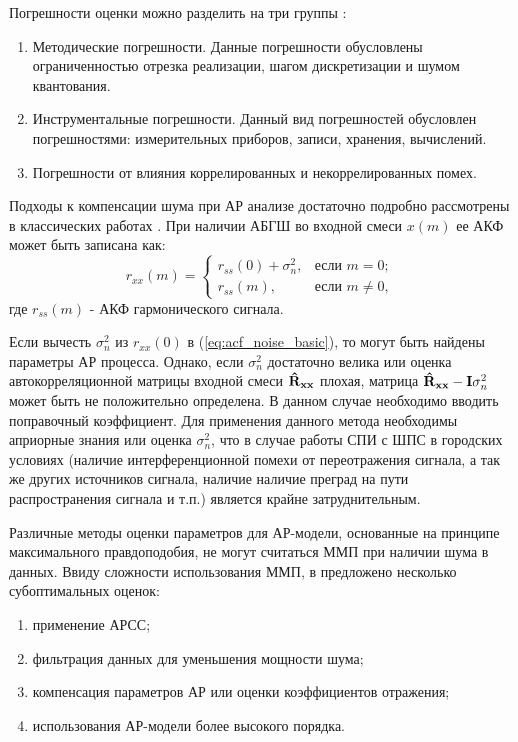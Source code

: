Погрешности оценки можно разделить на три группы \cite{bolshakov-book}:
\begin{enumerate}
	\item Методические погрешности. Данные погрешности обусловлены ограниченностью отрезка реализации, шагом дискретизации и шумом квантования.
	\item Инструментальные погрешности. Данный вид погрешностей обусловлен погрешностями: измерительных приборов, записи, хранения, вычислений.
	\item Погрешности от влияния коррелированных и некоррелированных помех.
\end{enumerate}

Подходы к компенсации шума при АР анализе достаточно подробно рассмотрены в классических работах \cite{kay_ar_book, kay_noise_compensation}.
При наличии АБГШ во входной смеси ${x(m)}$ ее АКФ может быть записана как:
\begin{equation}
	\label{eq:acf_noise_basic}
	r_{xx}(m) =	\begin{cases}
				r_{ss}(0) + \sigma_n^2, & \mbox{если } m=0; \\
				r_{ss}(m), & \mbox{если } m \ne 0,
			\end{cases}
\end{equation}
где ${r_{ss}(m)}$ - АКФ гармонического сигнала.

Если вычесть ${\sigma_n^2}$ из ${r_{xx}(0)}$ в (\ref{eq:acf_noise_basic}), то могут быть найдены параметры АР процесса. Однако, если ${\sigma_n^2}$ достаточно велика или 
оценка автокорреляционной матрицы входной смеси ${{\bf{\hat{R}_{xx}}}}$ плохая, матрица ${{\bf{\hat{R}_{xx}}} - {\bf{I}}\sigma_n^2}$ может быть не положительно определена. В данном
случае необходимо вводить поправочный коэффициент. Для применения данного метода необходимы априорные знания или оценка ${\sigma_n^2}$,
что в случае работы СПИ с ШПС в городских условиях (наличие интерференционной помехи от переотражения сигнала, а так же других источников сигнала,
наличие наличие преград на пути распространения сигнала и т.п.) является крайне затруднительным.

Различные методы оценки параметров для АР-модели, основанные на принципе максимального правдоподобия, не
могут считаться ММП при наличии шума в данных. Ввиду сложности использования ММП, в \cite{marpl_book, kay_ar_book} предложено несколько 
субоптимальных оценок:
\begin{enumerate}
	\item применение АРСС;
	\item фильтрация данных для уменьшения мощности шума;
	\item компенсация параметров АР или оценки коэффициентов отражения;
	\item использования АР-модели более высокого порядка.
\end{enumerate}

